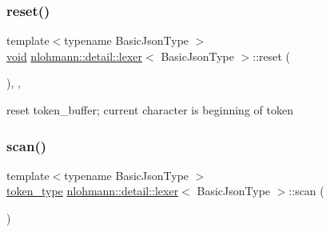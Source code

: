 \mbox{\label{classnlohmann_1_1detail_1_1lexer_acba34bc18af19f93186e682d02c3942d}} 
\subsubsection{\texorpdfstring{reset()}{reset()}}
{\footnotesize\ttfamily template$<$typename Basic\+Json\+Type $>$ \\
\hyperlink{namespacenlohmann_1_1detail_a59fca69799f6b9e366710cb9043aa77d}{void} \hyperlink{classnlohmann_1_1detail_1_1lexer}{nlohmann\+::detail\+::lexer}$<$ Basic\+Json\+Type $>$\+::reset (\begin{DoxyParamCaption}{ }\end{DoxyParamCaption})\hspace{0.3cm}{\ttfamily [inline]}, {\ttfamily [private]}, {\ttfamily [noexcept]}}



reset token\+\_\+buffer; current character is beginning of token 

\mbox{\label{classnlohmann_1_1detail_1_1lexer_aac3041cd2b9291e64fee38db422863c9}} 
\subsubsection{\texorpdfstring{scan()}{scan()}}
{\footnotesize\ttfamily template$<$typename Basic\+Json\+Type $>$ \\
\hyperlink{classnlohmann_1_1detail_1_1lexer_a3f313cdbe187cababfc5e06f0b69b098}{token\+\_\+type} \hyperlink{classnlohmann_1_1detail_1_1lexer}{nlohmann\+::detail\+::lexer}$<$ Basic\+Json\+Type $>$\+::scan (\begin{DoxyParamCaption}{ }\end{DoxyParamCaption})\hspace{0.3cm}{\ttfamily [inline]}}

\mbox{\label{classnlohmann_1_1detail_1_1lexer_a6f717deb553337736f27cdacccaee536}} 
